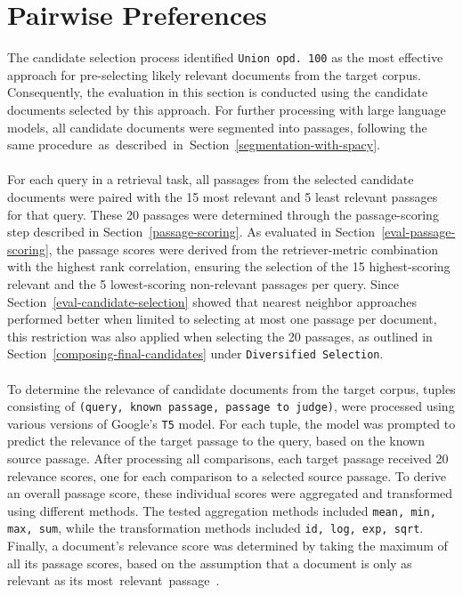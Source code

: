 \section{Pairwise Preferences}\label{eval-pairwise-preferences}

The candidate selection process identified \mbox{\texttt{Union opd.\ 100}} as the most effective approach for pre-selecting likely relevant documents from the target corpus. Consequently, the evaluation in this section is conducted using the candidate documents selected by this approach. For further processing with large language models, all candidate documents were segmented into passages, following the same \mbox{procedure as described in Section~\ref{segmentation-with-spacy}.}
\\\\
For each query in a retrieval task, all passages from the selected candidate documents were paired with the 15 most relevant and 5 least relevant passages for that query. These 20 passages were determined through the passage-scoring step described in Section~\ref{passage-scoring}. As evaluated in Section~\ref{eval-passage-scoring}, the passage scores were derived from the retriever-metric combination with the highest rank correlation, ensuring the selection of the 15 highest-scoring relevant and the 5 lowest-scoring non-relevant passages per query. Since Section~\ref{eval-candidate-selection} showed that nearest neighbor approaches performed better when limited to selecting at most one passage per document, this restriction was also applied when selecting the 20 passages, as outlined in Section~\ref{composing-final-candidates} under \texttt{Diversified Selection}.
\\\\
To determine the relevance of candidate documents from the target corpus, tuples consisting of \texttt{(query, known passage, passage to judge)}, were processed using various versions of Google's \texttt{T5} model. For each tuple, the model was prompted to predict the relevance of the target passage to the query, based on the known source passage. After processing all comparisons, each  \linebreak target passage received 20 relevance scores, one for each comparison \linebreak to a selected source passage. To derive an overall passage score, these individual scores were aggregated and transformed using different methods. \linebreak  The tested aggregation methods included \texttt{mean, min, max, sum}, while the transformation methods included \texttt{id, log, exp, sqrt}. Finally, a document's relevance score was determined by taking the maximum of all its passage scores, based on the assumption that a document is only as relevant as its \mbox{most relevant passage~\cite{craswell:2019}}.
